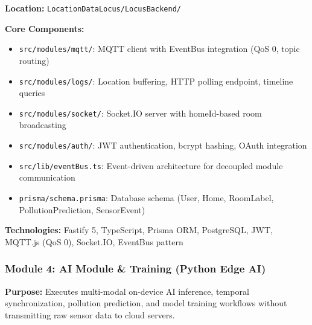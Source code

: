 \documentclass[conference]{IEEEtran}
\begin{document}
\textbf{Location:} \texttt{LocationDataLocus/LocusBackend/}

\textbf{Core Components:}
\begin{itemize}
    \item \texttt{src/modules/mqtt/}: MQTT client with EventBus integration (QoS 0, topic routing)
    \item \texttt{src/modules/logs/}: Location buffering, HTTP polling endpoint, timeline queries
    \item \texttt{src/modules/socket/}: Socket.IO server with homeId-based room broadcasting
    \item \texttt{src/modules/auth/}: JWT authentication, bcrypt hashing, OAuth integration
    \item \texttt{src/lib/eventBus.ts}: Event-driven architecture for decoupled module communication
    \item \texttt{prisma/schema.prisma}: Database schema (User, Home, RoomLabel, PollutionPrediction, SensorEvent)
\end{itemize}

\textbf{Technologies:} Fastify 5, TypeScript, Prisma ORM, PostgreSQL, JWT, MQTT.js (QoS 0), Socket.IO, EventBus pattern

\subsubsection{Module 4: AI Module \& Training (Python Edge AI)}

\textbf{Purpose:} Executes multi-modal on-device AI inference, temporal synchronization, pollution prediction, and model training workflows without transmitting raw sensor data to cloud servers.
\end{document}
